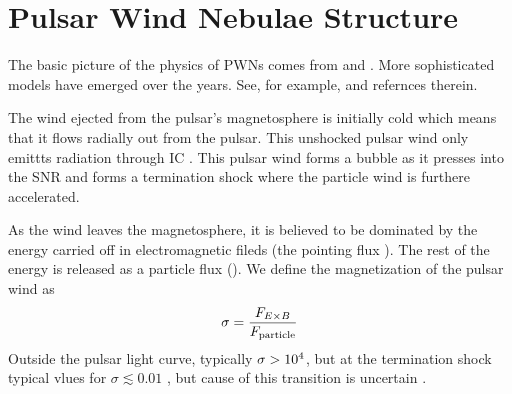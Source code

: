 \section{Pulsar Wind Nebulae Structure}

The basic picture of the physics of \acp{PWN}
comes from \cite{rees_1974_origin-magnetic} and
\cite{kennel_1984_magnetohydrodynamic-model}.  More 
sophisticated models have emerged over the years.  See, for example,
\cite{gelfand_2009_dynamical-model} and refernces therein.

The wind ejected from the pulsar's magnetosphere is initially
cold which means that it flows radially out from the pulsar.
This unshocked pulsar wind only emittts radiation through \ac{IC}
\citep{bogovalov_2000_very-high-energy-gamma}.  This pulsar wind forms
a bubble as it presses into the \ac{SNR} and forms a termination shock
where the particle wind is furthere accelerated.


As the wind leaves the magnetosphere, it is believed to be dominated
by the energy carried off in electromagnetic fileds (the pointing flux
\pointingflux).  The rest of the energy is released as a particle flux
(\particleflux).  We define the magnetization of the pulsar wind as
\begin{equation}
  \sigma = \frac{F_{E\times B}}{F_\text{particle}}
\end{equation}
Outside the pulsar light curve, typically $\sigma>10^4$,
but at the termination shock typical vlues for $\sigma\lesssim0.01$
\cite{kennel_1984a_confinement-pulsars},
but cause of this transition is uncertain \citep{gaensler_2006_evolution-structure}.

